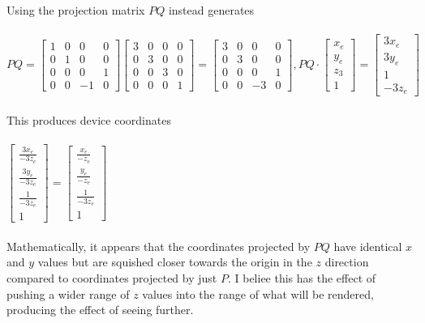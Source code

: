 \documentclass[letterpaper, 11pt]{article}
\begin{document}
Using the projection matrix $PQ$ instead generates \\ \\ 
$PQ = \begin{bmatrix}
1 & 0 & 0 & 0 \\
0 & 1 & 0 & 0 \\
0 & 0 & 0 & 1 \\
0 & 0 & -1 & 0
\end{bmatrix} 
\begin{bmatrix}
3 & 0 & 0 & 0 \\
0 & 3 & 0 & 0 \\
0 & 0 & 3 & 0 \\
0 & 0 & 0 & 1
\end{bmatrix}
=
\begin{bmatrix}
3 & 0 & 0 & 0 \\
0 & 3 & 0 & 0 \\
0 & 0 & 0 & 1 \\
0 & 0 & -3 & 0
\end{bmatrix},
PQ \cdot 
\begin{bmatrix}
x_e  \\
y_e  \\
z_3  \\
1 
\end{bmatrix}
=
\begin{bmatrix}
3x_e  \\
3y_e  \\
1  \\
-3z_e 
\end{bmatrix}$ \\ \\ 


This produces device coordinates \\ \\ 
$\begin{bmatrix}
\frac{3x_e}{-3z_e}  \\
\frac{3y_e}{-3z_e}  \\
\frac{1}{-3z_e} \\
1
\end{bmatrix}
=
\begin{bmatrix}
\frac{x_e}{-z_e}  \\
\frac{y_e}{-z_e}  \\
\frac{1}{-3z_e} \\
1
\end{bmatrix}$ \\ \\ 

Mathematically, it appears that the coordinates projected by $PQ$ have identical $x$ and $y$ values but are squished closer towards the origin in the $z$ direction compared to coordinates projected by just $P$. I beliee this has the effect of pushing a wider range of $z$ values into the range of what will be rendered, producing the effect of seeing further.
\end{document}

